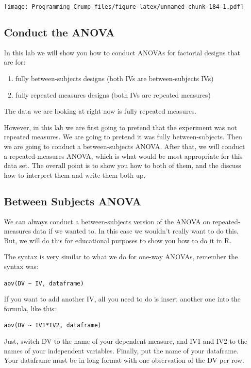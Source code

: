 \documentclass[]{book}
\providecommand{\tightlist}{%
  \setlength{\itemsep}{0pt}\setlength{\parskip}{0pt}}
\theoremstyle{definition}
\theoremstyle{definition}
\theoremstyle{definition}
\theoremstyle{remark}
\begin{document}
\texttt{[image: Programming\_Crump\_files/figure-latex/unnamed-chunk-184-1.pdf]}

\subsection{Conduct the ANOVA}\label{conduct-the-anova-1}

In this lab we will show you how to conduct ANOVAs for factorial designs
that are for:

\begin{enumerate}
\def\labelenumi{\arabic{enumi}.}
\tightlist
\item
  fully between-subjects designs (both IVs are between-subjects IVs)
\item
  fully repeated measures designs (both IVs are repeated measures)
\end{enumerate}

The data we are looking at right now is fully repeated measures.

However, in this lab we are first going to pretend that the experiment
was not repeated measures. We are going to pretend it was fully
between-subjects. Then we are going to conduct a between-subjects ANOVA.
After that, we will conduct a repeated-measures ANOVA, which is what
would be most appropriate for this data set. The overall point is to
show you how to both of them, and the discuss how to interpret them and
write them both up.

\subsection{Between Subjects ANOVA}\label{between-subjects-anova}

We can always conduct a between-subjects version of the ANOVA on
repeated-measures data if we wanted to. In this case we wouldn't really
want to do this. But, we will do this for educational purposes to show
you how to do it in R.

The syntax is very similar to what we do for one-way ANOVAs, remember
the syntax was:

\texttt{aov(DV\ \textasciitilde{}\ IV,\ dataframe)}

If you want to add another IV, all you need to do is insert another one
into the formula, like this:

\texttt{aov(DV\ \textasciitilde{}\ IV1*IV2,\ dataframe)}

Just, switch DV to the name of your dependent measure, and IV1 and IV2
to the names of your independent variables. Finally, put the name of
your dataframe. Your dataframe must be in long format with one
observation of the DV per row.
\end{document}

